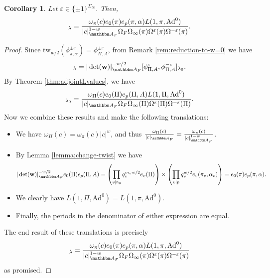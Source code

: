 \documentclass[10pt, twoside]{amsart}
\theoremstyle{plain}
\newtheorem{corollary}[theorem]{Corollary}
\theoremstyle{definition}
\theoremstyle{remark}
\numberwithin{equation}{subsection}
\def\A{\mathbbm A}
\def\Ad{\mathrm{Ad}}
\def\gn{\mathfrak n}
\def\tw{\mathrm{tw}}
\begin{document}
\begin{corollary}\label{cor:non-unitary}
Let $\varepsilon \in \{\pm 1\}^{\Sigma_\infty}$. Then,
\begin{equation*}
[\phi_{\pi,\alpha}^{\varepsilon},\phi_{\pi,\alpha}^{-\varepsilon}]_{\lambda} = \frac{\omega_{\pi}(c)e_0(\pi)e_{p}(\pi,\alpha)L(1,\pi,\mathrm{Ad}^0)}{|c|_{\A_F}^{1-w}\Omega_F \Omega_\infty(\pi) \Omega^{\varepsilon}(\pi)\Omega^{-\varepsilon}(\pi)}.
\end{equation*}
\end{corollary}
\begin{proof}
Since $\tw_{w/2}(\phi_{\pi,\alpha}^{\pm \varepsilon}) = \phi_{\Pi,A}^{\pm \varepsilon}$, from Remark \ref{rem:reduction-to-w=0} we have
\begin{equation*}
[\phi_{\pi,\alpha}^{\varepsilon},\phi_{\pi,\alpha}^{-\varepsilon}]_{\lambda} = |\det({ \boldsymbol{\mathrm{w}}})|_{\A_F}^{-w/2}[\phi_{\Pi,A}^{\varepsilon},\phi_{\Pi,A}^{-\varepsilon}]_{\lambda_0}.
\end{equation*}
By Theorem \ref{thm:adjointLvalues}, we have
\begin{equation*}
[\phi_{\Pi,A}^{\varepsilon},\phi_{\Pi,A}^{-\varepsilon}]_{\lambda_0} =  \frac{\omega_{\Pi}(c)e_0(\Pi)e_{p}(\Pi,A)L(1,\Pi,\mathrm{Ad}^0)}{|c|_{\A_F}\Omega_F \Omega_\infty(\Pi) \Omega^{\varepsilon}(\Pi)\Omega^{-\varepsilon}(\Pi)}.
\end{equation*}
Now we combine these results and make the following translations:

\begin{itemize}
\item We have $\omega_{\Pi}(c) = \omega_{\pi}(c)|c|^{w}$, and thus $\frac{\omega_{\Pi}(c)}{|c|_{\A_F}} = \frac{\omega_\pi(c)}{|c|_{\A_F}^{1-w}}$.
\item By Lemma \ref{lemma:change-twist} we have
\begin{align*}
|\det({ \boldsymbol{\mathrm{w}}})|_{\A_F}^{-w/2}e_0(\Pi)e_p(\Pi,A) = \left(\prod_{v \mid \gn_0} q_v^{m_vw/2} e_v(\Pi)\right)\times\left(\prod_{v \mid p} q_v^{w/2}e_v(\pi_v,\alpha_v)\right) = e_0(\pi)e_p(\pi,\alpha).
\end{align*}
\item We clearly have $L(1,\Pi,\Ad^0) = L(1,\pi,\Ad^0)$.
\item Finally, the periods in the denominator of either expression are equal.
\end{itemize}
The end result of these translations is precisely
\begin{equation*}
[\phi_{\pi,\alpha}^{\varepsilon},\phi_{\pi,\alpha}^{-\varepsilon}]_{\lambda} = \frac{\omega_{\pi}(c)e_0(\pi)e_{p}(\pi,\alpha)L(1,\pi,\mathrm{Ad}^0)}{|c|_{\A_F}^{1-w}\Omega_F \Omega_\infty(\pi) \Omega^{\varepsilon}(\pi)\Omega^{-\varepsilon}(\pi)}
\end{equation*}
as promised.
\end{proof}
\end{document}

